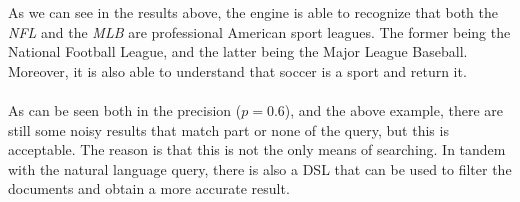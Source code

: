 As we can see in the results above, the engine is able to recognize that both the \textit{NFL} and the \textit{MLB} are professional American sport leagues.
The former being the National Football League, and the latter being the Major League Baseball.
Moreover, it is also able to understand that soccer is a sport and return it. \\ \\
As can be seen both in the precision ($p = 0.6$), and the above example, there are still some noisy results that match part or none of the query, but this is acceptable.
The reason is that this is not the only means of searching.
In tandem with the natural language query, there is also a DSL that can be used to filter the documents and obtain a more accurate result.

